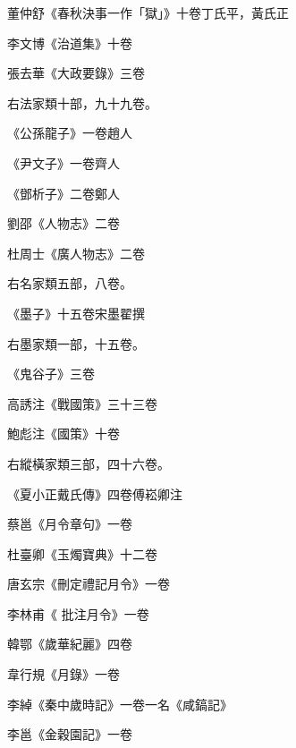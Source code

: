 \begin{pinyinscope}
 董仲舒《春秋決事一作「獄」》十卷丁氏平，黃氏正



 李文博《治道集》十卷



 張去華《大政要錄》三卷



 右法家類十部，九十九卷。



 《公孫龍子》一卷趙人



 《尹文子》一卷齊人



 《鄧析子》二卷鄭人



 劉邵《人物志》二卷



 杜周士《廣人物志》二卷



 右名家類五部，八卷。



 《墨子》十五卷宋墨翟撰



 右墨家類一部，十五卷。



 《鬼谷子》三卷



 高誘注《戰國策》三十三卷



 鮑彪注《國策》十卷



 右縱橫家類三部，四十六卷。



 《夏小正戴氏傳》四卷傅崧卿注



 蔡邕《月令章句》一卷



 杜臺卿《玉燭寶典》十二卷



 唐玄宗《刪定禮記月令》一卷



 李林甫《
 批注月令》一卷



 韓鄂《歲華紀麗》四卷



 韋行規《月錄》一卷



 李綽《秦中歲時記》一卷一名《咸鎬記》



 李邕《金穀園記》一卷




\end{pinyinscope}
